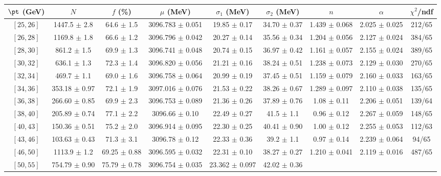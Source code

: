 \begin{tabular}{c||c|c|c|c|c|c|c||c}
$\pt$ (GeV) & $N$ & $f$ (\%) & $\mu$ (MeV) & $\sigma_1$ (MeV) & $\sigma_2$ (MeV) & $n$ &  $\alpha$ & $\chi^2$/ndf \\
\hline
$[25, 26]$ & 1447.5 $\pm$ 2.8 & 
64.6 $\pm$ 1.5 & 
3096.783 $\pm$ 0.051 & 
19.85 $\pm$ 0.17 & 
34.70 $\pm$ 0.37 & 
1.439 $\pm$ 0.068 & 
2.025 $\pm$ 0.025 & 
212/65\\
$[26, 28]$ & 1169.8 $\pm$ 1.8 & 
66.6 $\pm$ 1.2 & 
3096.796 $\pm$ 0.042 & 
20.27 $\pm$ 0.14 & 
35.56 $\pm$ 0.34 & 
1.204 $\pm$ 0.056 & 
2.127 $\pm$ 0.024 & 
384/65\\
$[28, 30]$ & 861.2 $\pm$ 1.5 & 
69.9 $\pm$ 1.3 & 
3096.741 $\pm$ 0.048 & 
20.74 $\pm$ 0.15 & 
36.97 $\pm$ 0.42 & 
1.161 $\pm$ 0.057 & 
2.155 $\pm$ 0.024 & 
389/65\\
$[30, 32]$ & 636.1 $\pm$ 1.3 & 
72.3 $\pm$ 1.4 & 
3096.820 $\pm$ 0.056 & 
21.21 $\pm$ 0.16 & 
38.24 $\pm$ 0.51 & 
1.238 $\pm$ 0.073 & 
2.129 $\pm$ 0.030 & 
270/65\\
$[32, 34]$ & 469.7 $\pm$ 1.1 & 
69.0 $\pm$ 1.6 & 
3096.758 $\pm$ 0.064 & 
20.99 $\pm$ 0.19 & 
37.45 $\pm$ 0.51 & 
1.159 $\pm$ 0.079 & 
2.160 $\pm$ 0.033 & 
163/65\\
$[34, 36]$ & 353.18 $\pm$ 0.97 & 
72.1 $\pm$ 1.9 & 
3097.016 $\pm$ 0.076 & 
21.53 $\pm$ 0.22 & 
38.26 $\pm$ 0.67 & 
1.289 $\pm$ 0.097 & 
2.110 $\pm$ 0.038 & 
135/65\\
$[36, 38]$ & 266.60 $\pm$ 0.85 & 
69.9 $\pm$ 2.3 & 
3096.753 $\pm$ 0.089 & 
21.36 $\pm$ 0.26 & 
37.89 $\pm$ 0.76 & 
1.08 $\pm$ 0.11 & 
2.206 $\pm$ 0.051 & 
139/64\\
$[38, 40]$ & 205.89 $\pm$ 0.74 & 
77.1 $\pm$ 2.2 & 
3096.66 $\pm$ 0.10 & 
22.49 $\pm$ 0.27 & 
41.5 $\pm$ 1.1 & 
0.96 $\pm$ 0.12 & 
2.267 $\pm$ 0.059 & 
148/65\\
$[40, 43]$ & 150.36 $\pm$ 0.51 & 
75.2 $\pm$ 2.0 & 
3096.914 $\pm$ 0.095 & 
22.30 $\pm$ 0.25 & 
40.41 $\pm$ 0.90 & 
1.00 $\pm$ 0.12 & 
2.255 $\pm$ 0.053 & 
112/63\\
$[43, 46]$ & 103.63 $\pm$ 0.43 & 
71.3 $\pm$ 3.1 & 
3096.78 $\pm$ 0.12 & 
22.33 $\pm$ 0.36 & 
39.2 $\pm$ 1.1 & 
0.97 $\pm$ 0.14 & 
2.239 $\pm$ 0.064 & 
94/65\\
$[46, 50]$ & 1113.9 $\pm$ 1.2 & 
69.25 $\pm$ 0.88 & 
3096.595 $\pm$ 0.032 & 
22.31 $\pm$ 0.10 & 
38.27 $\pm$ 0.27 & 
1.210 $\pm$ 0.041 & 
2.119 $\pm$ 0.016 & 
487/65\\
$[50, 55]$ & 754.79 $\pm$ 0.90 & 
75.79 $\pm$ 0.78 & 
3096.754 $\pm$ 0.035 & 
23.362 $\pm$ 0.097 & 
42.02 $\pm$ 0.36 & 

\end{tabular}
